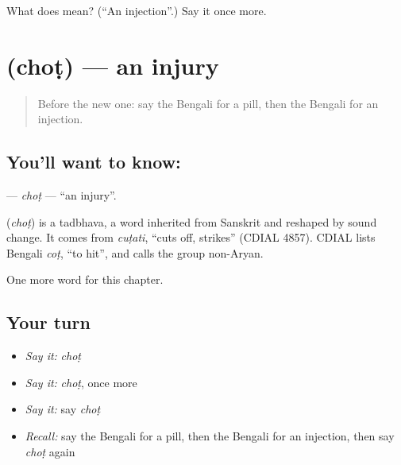 \begin{tcolorbox}[breakable,colback=teal!4,colframe=teal!35!black,title={Before you move on}]
What does  mean? (\textquotedblleft{}An injection\textquotedblright{}.) Say it once more.
\end{tcolorbox}
\section[\texorpdfstring{\bn{চোট} (choṭ)}{চোট (choṭ)}]{ (choṭ) — an injury}

\label{lesson:BN-C185-chot}



\begin{quote}
Before the new one: say the Bengali for a pill, then the Bengali for an injection.
\end{quote}

\subsection*{You'll want to know: }
\textbf{} — \emph{choṭ} — \textquotedblleft{}an injury\textquotedblright{}.

\begin{cousinweb}
\textbf{} (\emph{choṭ}) is a tadbhava, a word inherited from Sanskrit and reshaped by sound change. It comes from \emph{cuṭati}, \textquotedblleft{}cuts off, strikes\textquotedblright{} (CDIAL 4857). CDIAL lists Bengali \emph{coṭ}, \textquotedblleft{}to hit\textquotedblright{}, and calls the group non-Aryan.
\end{cousinweb}

\begin{grammarlens}[title={What you've built}]
One more word for this chapter.
\end{grammarlens}

\subsection*{Your turn}
\begin{itemize}
\raggedright
  \item \emph{Say it:} \emph{choṭ}
  \item \emph{Say it:} \emph{choṭ}, once more
  \item \emph{Say it:} say \emph{choṭ}
  \item \emph{Recall:} say the Bengali for a pill, then the Bengali for an injection, then say \emph{choṭ} again
\end{itemize}

